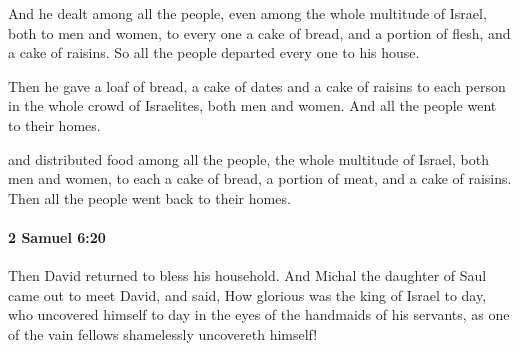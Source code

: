 			\begin{versebox}
					\item[BHS] 
					\item[ASV] And he dealt among all the people, even among the whole multitude of Israel, both to men and women, to every one a cake of bread, and a portion of flesh, and a cake of raisins. So all the people departed every one to his house.
					\item[NIV] Then he gave a loaf of bread, a cake of dates and a cake of raisins to each person in the whole crowd of Israelites, both men and women. And all the people went to their homes.
					\item[NRSV] and distributed food among all the people, the whole multitude of Israel, both men and women, to each a cake of bread, a portion of meat, and a cake of raisins. Then all the people went back to their homes.
			\end{versebox}

		\paragraph{2 Samuel 6:20} %
			\label{2SAMUEL-6-20}

			Then David returned to bless his household. And Michal the daughter of Saul came out to meet David, and said, How glorious was the king of Israel to day, who uncovered himself to day in the eyes of the handmaids of his servants, as one of the vain fellows shamelessly uncovereth himself!

